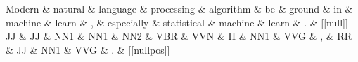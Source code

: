 \documentclass{article}
\begin{document}
\begin{dependency}[theme = simple]
\begin{deptext}[column sep=1em]
Modern \& natural \& language \& processing \& algorithm \& be \& ground \& in \& machine \& learn \& , \& especially \& statistical \& machine \& learn \& . \& {[}{[}null{]}{]} \\
JJ \& JJ \& NN1 \& NN1 \& NN2 \& VBR \& VVN \& II \& NN1 \& VVG \& , \& RR \& JJ \& NN1 \& VVG \& . \& {[}{[}nullpos{]}{]} \\
\end{deptext}
\end{dependency}
\end{document}
